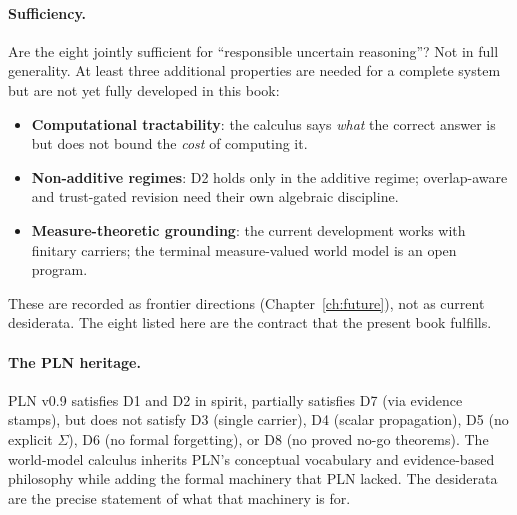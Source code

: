 \paragraph{Sufficiency.}
Are the eight jointly sufficient for ``responsible uncertain
reasoning''?  Not in full generality.  At least three additional
properties are needed for a complete system but are not yet fully
developed in this book:
\begin{itemize}
\item \textbf{Computational tractability}: the calculus says
  \emph{what} the correct answer is but does not bound the
  \emph{cost} of computing it.
\item \textbf{Non-additive regimes}: D2 holds only in the additive
  regime; overlap-aware and trust-gated revision need their own
  algebraic discipline.
\item \textbf{Measure-theoretic grounding}: the current development
  works with finitary carriers; the terminal measure-valued world
  model is an open program.
\end{itemize}
These are recorded as frontier directions (Chapter~\ref{ch:future}),
not as current desiderata.  The eight listed here are the contract
that the present book fulfills.

\paragraph{The PLN heritage.}
PLN v0.9 satisfies D1 and D2 in spirit, partially satisfies D7 (via
evidence stamps), but does not satisfy D3 (single carrier), D4 (scalar
propagation), D5 (no explicit $\Sigma$), D6 (no formal forgetting),
or D8 (no proved no-go theorems).  The world-model calculus inherits
PLN's conceptual vocabulary and evidence-based philosophy while adding
the formal machinery that PLN lacked.  The desiderata are the precise
statement of what that machinery is for.

